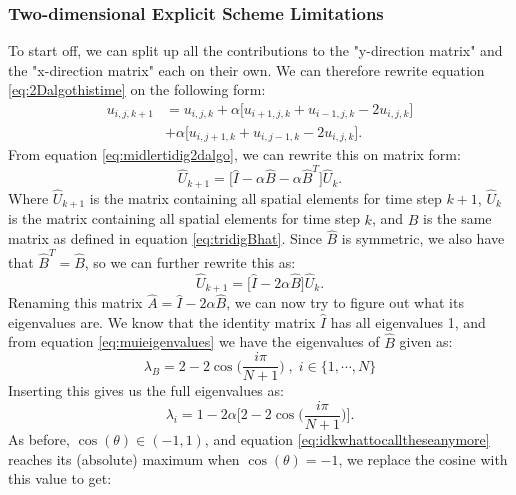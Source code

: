 \documentclass[reprint,english,notitlepage]{revtex4-1}  %
\begin{document}
\subsubsection{Two-dimensional Explicit Scheme Limitations}

To start off, we can split up all the contributions to the "y-direction matrix" and the "x-direction matrix" each on their own. We can therefore rewrite equation \ref{eq:2Dalgothistime} on the following form:
\begin{equation}\label{eq:midlertidig2dalgo}
    \begin{split}
    u_{i,j,k+1} &= u_{i,j,k} + \alpha\Big[ u_{i+1,j,k} + u_{i-1,j,k} - 2u_{i,j,k}\Big]\\ &+ \alpha\Big[u_{i,j+1,k} + u_{i,j-1,k} - 2u_{i,j,k} \Big].
    \end{split}
\end{equation}
From equation \ref{eq:midlertidig2dalgo}, we can rewrite this on matrix form:
\begin{equation}\label{eq:soonthiswillbeheat}
    \hat{U}_{k+1} = \Big[\hat{I} - \alpha\hat{B} - \alpha\hat{B}^T\Big]\hat{U}_{k}.
\end{equation}
Where $\hat{U}_{k+1}$ is the matrix containing all spatial elements for time step $k+1$, $\hat{U}_k$ is the matrix containing all spatial elements for time step $k$, and $\hat{B}$ is the same matrix as defined in equation \ref{eq:tridigBhat}. Since $\hat{B}$ is symmetric, we also have that $\hat{B}^T = \hat{B}$, so we can further rewrite this as:
\begin{equation}\label{eq:thefirst}
    \hat{U}_{k+1} = \Big[\hat{I} - 2\alpha\hat{B}\Big]\hat{U}_{k}  .  
\end{equation}
Renaming this matrix $\hat{A} = \hat{I} - 2\alpha\hat{B}$, we can now try to figure out what its eigenvalues are. We know that the identity matrix $\hat{I}$ has all eigenvalues 1, and from equation \ref{eq:muieigenvalues} we have the eigenvalues of $\hat{B}$ given as:
\begin{equation}
    \lambda_{B} = 2-2\cos{\Big(\frac{i\pi}{N+1}\Big)}\;,\;i\in\{1,\cdots,N\}
\end{equation}
Inserting this gives us the full eigenvalues as:
\begin{equation}\label{eq:idkwhattocalltheseanymore}
    \lambda_i = 1 - 2\alpha\Big[2-2\cos{\Big(\frac{i\pi}{N+1}\Big)}\Big].
\end{equation}
As before, $\cos{(\theta)} \in (-1,1)$, and equation \ref{eq:idkwhattocalltheseanymore} reaches its (absolute) maximum when $\cos{(\theta)} = -1$, we replace the cosine with this value to get:
\end{document}
